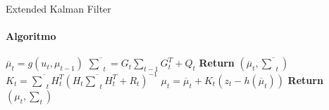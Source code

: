 \documentclass[aspectratio=169]{beamer}
\begin{document}
\begin{frame}[c]{Extended Kalman Filter}
    \framesubtitle{Algoritmo}
    \begin{algorithm}[H]
        \caption{Extended-Kalman-Filter}
        \begin{algorithmic}[1]
            \State $\overline{\mu}_t = g(u_t, \mu_{t-1})$
            \State $ \overline{\textstyle\sum}_t = G_t {\textstyle\sum}_{t-1} G_t^T+ Q_t$ 
            \State \textbf{Return} $\left(\overline{\mu}_t, \overline{\textstyle\sum}_t\right)$
        \EndProcedure
            \State $K_t = \overline{\textstyle\sum}_tH_t^T(H_t\overline{\textstyle\sum}_tH_t^T+R_t)^{-1}$
            \State $\mu_t  = \overline{\mu}_t + K_t(z_t -h(\overline\mu_t))$
            \State \textbf{Return} $\left(\mu_t, \textstyle\sum_t\right)$
        \EndProcedure
        \end{algorithmic}
    \end{algorithm}
\end{frame}
\end{document}
